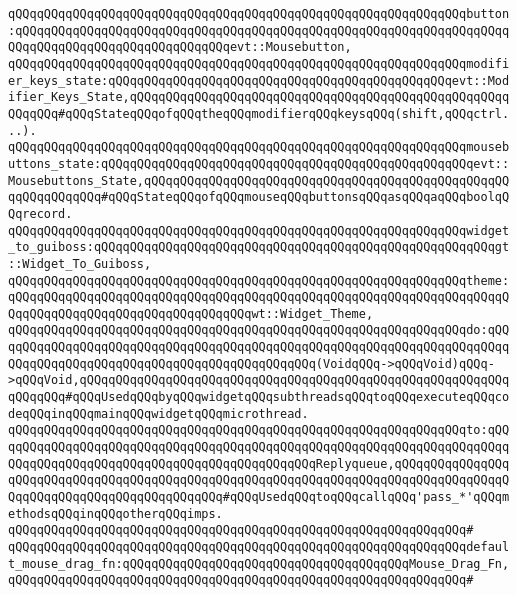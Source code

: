 \verb|qQQqqQQqqQQqqQQqqQQqqQQqqQQqqQQqqQQqqQQqqQQqqQQqqQQqqQQqqQQqqQQqbutton:qQQqqQQqqQQqqQQqqQQqqQQqqQQqqQQqqQQqqQQqqQQqqQQqqQQqqQQqqQQqqQQqqQQqqQQqqQQqqQQqqQQqqQQqqQQqqQQqqQQqevt::Mousebutton,|\newline
\verb|qQQqqQQqqQQqqQQqqQQqqQQqqQQqqQQqqQQqqQQqqQQqqQQqqQQqqQQqqQQqqQQqmodifier_keys_state:qQQqqQQqqQQqqQQqqQQqqQQqqQQqqQQqqQQqqQQqqQQqqQQqevt::Modifier_Keys_State,qQQqqQQqqQQqqQQqqQQqqQQqqQQqqQQqqQQqqQQqqQQqqQQqqQQqqQQqqQQq#qQQqStateqQQqofqQQqtheqQQqmodifierqQQqkeysqQQq(shift,qQQqctrl...).|\newline
\verb|qQQqqQQqqQQqqQQqqQQqqQQqqQQqqQQqqQQqqQQqqQQqqQQqqQQqqQQqqQQqqQQqmousebuttons_state:qQQqqQQqqQQqqQQqqQQqqQQqqQQqqQQqqQQqqQQqqQQqqQQqqQQqevt::Mousebuttons_State,qQQqqQQqqQQqqQQqqQQqqQQqqQQqqQQqqQQqqQQqqQQqqQQqqQQqqQQqqQQqqQQq#qQQqStateqQQqofqQQqmouseqQQqbuttonsqQQqasqQQqaqQQqboolqQQqrecord.|\newline
\verb|qQQqqQQqqQQqqQQqqQQqqQQqqQQqqQQqqQQqqQQqqQQqqQQqqQQqqQQqqQQqqQQqwidget_to_guiboss:qQQqqQQqqQQqqQQqqQQqqQQqqQQqqQQqqQQqqQQqqQQqqQQqqQQqqQQqgt::Widget_To_Guiboss,|\newline
\verb|qQQqqQQqqQQqqQQqqQQqqQQqqQQqqQQqqQQqqQQqqQQqqQQqqQQqqQQqqQQqqQQqtheme:qQQqqQQqqQQqqQQqqQQqqQQqqQQqqQQqqQQqqQQqqQQqqQQqqQQqqQQqqQQqqQQqqQQqqQQqqQQqqQQqqQQqqQQqqQQqqQQqqQQqqQQqwt::Widget_Theme,|\newline
\verb|qQQqqQQqqQQqqQQqqQQqqQQqqQQqqQQqqQQqqQQqqQQqqQQqqQQqqQQqqQQqqQQqdo:qQQqqQQqqQQqqQQqqQQqqQQqqQQqqQQqqQQqqQQqqQQqqQQqqQQqqQQqqQQqqQQqqQQqqQQqqQQqqQQqqQQqqQQqqQQqqQQqqQQqqQQqqQQqqQQqqQQq(VoidqQQq->qQQqVoid)qQQq->qQQqVoid,qQQqqQQqqQQqqQQqqQQqqQQqqQQqqQQqqQQqqQQqqQQqqQQqqQQqqQQqqQQqqQQqqQQq#qQQqUsedqQQqbyqQQqwidgetqQQqsubthreadsqQQqtoqQQqexecuteqQQqcodeqQQqinqQQqmainqQQqwidgetqQQqmicrothread.|\newline
\verb|qQQqqQQqqQQqqQQqqQQqqQQqqQQqqQQqqQQqqQQqqQQqqQQqqQQqqQQqqQQqqQQqto:qQQqqQQqqQQqqQQqqQQqqQQqqQQqqQQqqQQqqQQqqQQqqQQqqQQqqQQqqQQqqQQqqQQqqQQqqQQqqQQqqQQqqQQqqQQqqQQqqQQqqQQqqQQqqQQqqQQqReplyqueue,qQQqqQQqqQQqqQQqqQQqqQQqqQQqqQQqqQQqqQQqqQQqqQQqqQQqqQQqqQQqqQQqqQQqqQQqqQQqqQQqqQQqqQQqqQQqqQQqqQQqqQQqqQQqqQQqqQQq#qQQqUsedqQQqtoqQQqcallqQQq'pass_*'qQQqmethodsqQQqinqQQqotherqQQqimps.|\newline
\verb|qQQqqQQqqQQqqQQqqQQqqQQqqQQqqQQqqQQqqQQqqQQqqQQqqQQqqQQqqQQqqQQq#|\newline
\verb|qQQqqQQqqQQqqQQqqQQqqQQqqQQqqQQqqQQqqQQqqQQqqQQqqQQqqQQqqQQqqQQqdefault_mouse_drag_fn:qQQqqQQqqQQqqQQqqQQqqQQqqQQqqQQqqQQqqQQqMouse_Drag_Fn,|\newline
\verb|qQQqqQQqqQQqqQQqqQQqqQQqqQQqqQQqqQQqqQQqqQQqqQQqqQQqqQQqqQQqqQQq#|\newline
